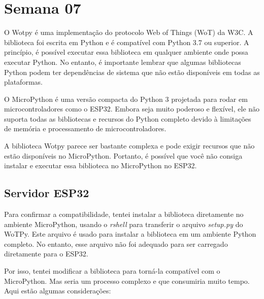 
\section{Semana 07}

O Wotpy é uma implementação do protocolo Web of Things (WoT) da W3C. A biblioteca foi escrita em Python e é compatível com Python 3.7 ou superior. A princípio, é possível executar essa biblioteca em qualquer ambiente onde possa executar Python. No entanto, é importante lembrar que algumas bibliotecas Python podem ter dependências de sistema que não estão disponíveis em todas as plataformas.

O MicroPython é uma versão compacta do Python 3 projetada para rodar em microcontroladores como o ESP32. Embora seja muito poderoso e flexível, ele não suporta todas as bibliotecas e recursos do Python completo devido à limitações de memória e processamento de microcontroladores.

A biblioteca Wotpy parece ser bastante complexa e pode exigir recursos que não estão disponíveis no MicroPython. Portanto, é possível que você não consiga instalar e executar essa biblioteca no MicroPython no ESP32.

\subsection{Servidor ESP32}

Para confirmar a compatibilidade, tentei instalar a biblioteca diretamente no ambiente MicroPython, usando o \textit{rshell} para transferir o arquivo \textit{setup.py} do WoTPy. Este arquivo é usado para instalar a biblioteca em um ambiente Python completo. No entanto, esse arquivo não foi adequado para ser carregado diretamente para o ESP32.

Por isso, tentei modificar a biblioteca para torná-la compatível com o MicroPython. Mas seria um processo complexo e que consumiria muito tempo. Aqui estão algumas considerações:

